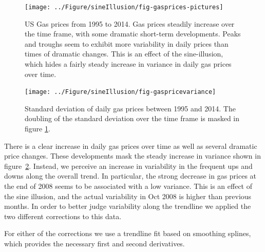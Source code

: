 \documentclass[11pt]{isuthesis}\usepackage[]{graphicx}\usepackage[]{color}
\newenvironment{knitrout}{}{} %
\begin{document}
\begin{figure}[h!tbp]
\begin{knitrout}
\color{fgcolor}

{\centering \texttt{[image: ../Figure/sineIllusion/fig-gasprices-pictures]} 

}



\end{knitrout}

\caption[US Gas prices from 1995 to 2014]{US Gas prices from 1995 to 2014. Gas prices steadily increase over the time frame, with some dramatic short-term developments. Peaks and troughs seem to exhibit more variability in daily prices than times of dramatic changes. This is an effect of the sine-illusion, which hides a fairly steady increase in variance in daily gas prices over time.}\label{fig:gasprices}
\end{figure}
\begin{figure}\centering
\begin{knitrout}
\color{fgcolor}

{\centering \texttt{[image: ../Figure/sineIllusion/fig-gaspricevariance]} 

}



\end{knitrout}

\caption[Standard deviation of daily gas prices between 1995 and 2014. ]{Standard deviation of daily gas prices between 1995 and 2014. The doubling of the standard deviation over the time frame is masked in figure \ref{fig:gasprices}.\label{fig:gasvariance}}
\end{figure}
There is a clear increase in daily gas prices over time as well as several dramatic price changes. These developments mask the steady increase in variance shown in figure~\ref{fig:gasvariance}. Instead, we perceive an increase in variability in the frequent ups and downs along the overall trend. In particular, the strong decrease in gas prices at the end of 2008 seems to be associated with a low variance. This is an effect of the sine illusion, and the actual variability in Oct 2008 is higher than previous months. In order to better judge variability along the trendline we applied the two different corrections to this data. 

For either of the corrections we use a trendline fit based on smoothing splines, which provides the necessary first and second derivatives.
\end{document}
